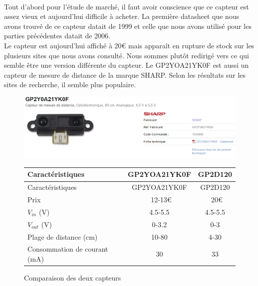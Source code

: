 \documentclass[oneside,a4paper,12pt]{article}
\begin{document}
	\paragraph{}
	Tout d’abord pour l’étude de marché, il faut avoir conscience que ce capteur est assez vieux et aujourd’hui difficile à acheter. La première datasheet que nous avons trouvé de ce capteur datait de 1999 et celle que nous avons utilisé pour les parties précédentes datait de 2006.\\
	Le capteur est aujourd’hui affiché à 20€ mais apparaît en rupture de stock sur les plusieurs sites que nous avons consulté. Nous sommes plutôt redirigé vers ce qui semble être une version différente du capteur. 
	Le GP2YOA21YK0F est aussi un capteur de mesure de distance de la marque SHARP. Selon les résultats sur les sites de recherche, il semble plus populaire.\\
	\begin{figure}[h]
		\centering
		\includegraphics[width=12cm]{img1.png}
	\end{figure}
	\begin{figure}[h]
		\centering
		\caption{Comparaison des deux capteurs}
		\begin{tabular}{|p{}|c|c|}
			\hline
			Caractéristiques & GP2YOA21YK0F & GP2D120 \\
			\hline
			Caractéristiques & GP2YOA21YK0F & GP2D120 \\
			\hline
			Prix & ~12-13€ & ~20€ \\
			\hline
			$V_{in}$ (V) & 4.5-5.5 & 4.5-5.5 \\
			\hline
			$V_{out}$ (V) & 0-3.2 & 0-3 \\
			\hline
			Plage de distance (cm) & 10-80 & 4-30 \\
			\hline
			Consommation de courant (mA) & 30 & 33 \\
			\hline
		\end{tabular}
	\end{figure}
\end{document}
